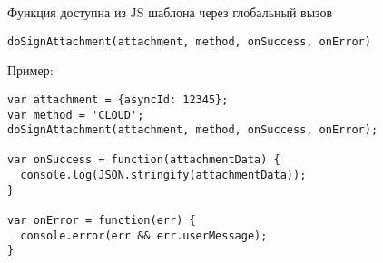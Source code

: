 Функция доступна из JS шаблона через глобальный вызов

\begin{verbatim}
doSignAttachment(attachment, method, onSuccess, onError) 
\end{verbatim}

Пример:
\begin{verbatim}
var attachment = {asyncId: 12345};
var method = 'CLOUD';
doSignAttachment(attachment, method, onSuccess, onError);

var onSuccess = function(attachmentData) {
  console.log(JSON.stringify(attachmentData));
}

var onError = function(err) {
  console.error(err && err.userMessage);
}
\end{verbatim}

